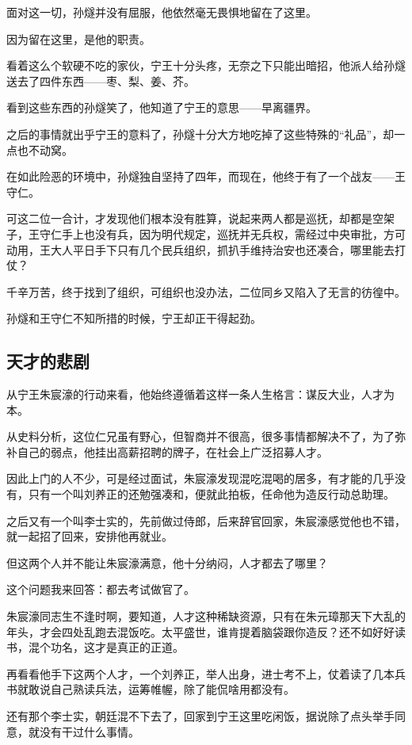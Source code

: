 \begin{multicols}{\theparacolNo}
面对这一切，孙燧并没有屈服，他依然毫无畏惧地留在了这里。

因为留在这里，是他的职责。

看着这么个软硬不吃的家伙，宁王十分头疼，无奈之下只能出暗招，他派人给孙燧送去了四件东西——枣、梨、姜、芥。

看到这些东西的孙燧笑了，他知道了宁王的意思——早离疆界。

之后的事情就出乎宁王的意料了，孙燧十分大方地吃掉了这些特殊的“礼品”，却一点也不动窝。

在如此险恶的环境中，孙燧独自坚持了四年，而现在，他终于有了一个战友——王守仁。

可这二位一合计，才发现他们根本没有胜算，说起来两人都是巡抚，却都是空架子，王守仁手上也没有兵，因为明代规定，巡抚并无兵权，需经过中央审批，方可动用，王大人平日手下只有几个民兵组织，抓扒手维持治安也还凑合，哪里能去打仗？

千辛万苦，终于找到了组织，可组织也没办法，二位同乡又陷入了无言的彷徨中。

孙燧和王守仁不知所措的时候，宁王却正干得起劲。

\subsection{天才的悲剧}
从宁王朱宸濠的行动来看，他始终遵循着这样一条人生格言：谋反大业，人才为本。

从史料分析，这位仁兄虽有野心，但智商并不很高，很多事情都解决不了，为了弥补自己的弱点，他挂出高薪招聘的牌子，在社会上广泛招募人才。

因此上门的人不少，可是经过面试，朱宸濠发现混吃混喝的居多，有才能的几乎没有，只有一个叫刘养正的还勉强凑和，便就此拍板，任命他为造反行动总助理。

之后又有一个叫李士实的，先前做过侍郎，后来辞官回家，朱宸濠感觉他也不错，就一起招了回来，安排他再就业。

但这两个人并不能让朱宸濠满意，他十分纳闷，人才都去了哪里？

这个问题我来回答：都去考试做官了。

朱宸濠同志生不逢时啊，要知道，人才这种稀缺资源，只有在朱元璋那天下大乱的年头，才会四处乱跑去混饭吃。太平盛世，谁肯提着脑袋跟你造反？还不如好好读书，混个功名，这才是真正的正道。

再看看他手下这两个人才，一个刘养正，举人出身，进士考不上，仗着读了几本兵书就敢说自己熟读兵法，运筹帷幄，除了能侃啥用都没有。

还有那个李士实，朝廷混不下去了，回家到宁王这里吃闲饭，据说除了点头举手同意，就没有干过什么事情。


\end{multicols}
